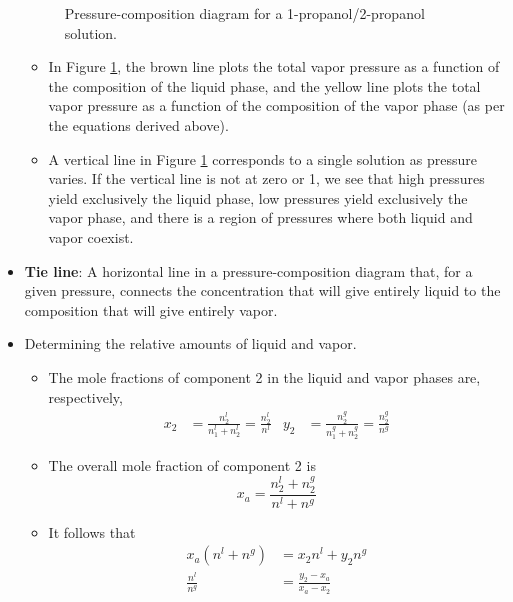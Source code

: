 \documentclass[../notes.tex]{subfiles}
\begin{document}
\begin{itemize}
\begin{figure}[H]
        \caption{Pressure-composition diagram for a 1-propanol/2-propanol solution.}
        \label{fig:PCdiagram}
    \end{figure}
    \begin{itemize}
        \item In Figure \ref{fig:PCdiagram}, the brown line plots the total vapor pressure as a function of the composition of the liquid phase, and the yellow line plots the total vapor pressure as a function of the composition of the vapor phase (as per the equations derived above).
        \item A vertical line in Figure \ref{fig:PCdiagram} corresponds to a single solution as pressure varies. If the vertical line is not at zero or 1, we see that high pressures yield exclusively the liquid phase, low pressures yield exclusively the vapor phase, and there is a region of pressures where both liquid and vapor coexist.
    \end{itemize}
    \item \textbf{Tie line}: A horizontal line in a pressure-composition diagram that, for a given pressure, connects the concentration that will give entirely liquid to the composition that will give entirely vapor.
    \item Determining the relative amounts of liquid and vapor.
    \begin{itemize}
        \item The mole fractions of component 2 in the liquid and vapor phases are, respectively,
        \begin{align*}
            x_2 &= \frac{n_2^l}{n_1^l+n_2^l} = \frac{n_2^l}{n^l}&
            y_2 &= \frac{n_2^g}{n_1^g+n_2^g} = \frac{n_2^g}{n^g}
        \end{align*}
        \item The overall mole fraction of component 2 is
        \begin{equation*}
            x_a = \frac{n_2^l+n_2^g}{n^l+n^g}
        \end{equation*}
        \item It follows that
        \begin{align*}
            x_a(n^l+n^g) &= x_2n^l+y_2n^g\\
            \frac{n^l}{n^g} &= \frac{y_2-x_a}{x_a-x_2}

\end{align*}
\end{itemize}
\end{itemize}
\end{document}

